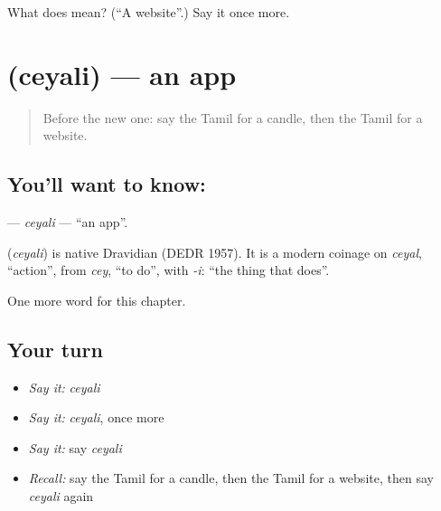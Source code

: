 \begin{tcolorbox}[breakable,colback=teal!4,colframe=teal!35!black,title={Before you move on}]
What does  mean? (\textquotedblleft{}A website\textquotedblright{}.) Say it once more.
\end{tcolorbox}
\section[\texorpdfstring{\ta{செயலி} (ceyali)}{செயலி (ceyali)}]{ (ceyali) — an app}

\label{lesson:TA-C189-ceyali}



\begin{quote}
Before the new one: say the Tamil for a candle, then the Tamil for a website.
\end{quote}

\subsection*{You'll want to know: }
\textbf{} — \emph{ceyali} — \textquotedblleft{}an app\textquotedblright{}.

\begin{cousinweb}
\textbf{} (\emph{ceyali}) is native Dravidian (DEDR 1957). It is a modern coinage on \emph{ceyal}, \textquotedblleft{}action\textquotedblright{}, from \emph{cey}, \textquotedblleft{}to do\textquotedblright{}, with \emph{-i}: \textquotedblleft{}the thing that does\textquotedblright{}.
\end{cousinweb}

\begin{grammarlens}[title={What you've built}]
One more word for this chapter.
\end{grammarlens}

\subsection*{Your turn}
\begin{itemize}
\raggedright
  \item \emph{Say it:} \emph{ceyali}
  \item \emph{Say it:} \emph{ceyali}, once more
  \item \emph{Say it:} say \emph{ceyali}
  \item \emph{Recall:} say the Tamil for a candle, then the Tamil for a website, then say \emph{ceyali} again
\end{itemize}

